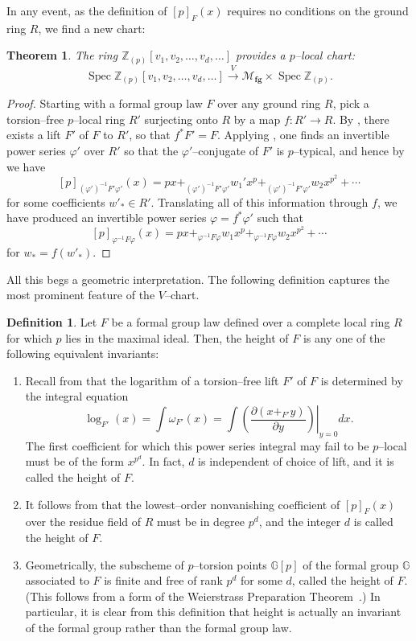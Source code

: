 \documentclass{amsart}
\newcommand{\Z}{\mathbb Z}
\newcommand{\G}{\mathbb G}
\newcommand{\<}{\langle}
\renewcommand{\>}{\rangle}
\renewcommand{\phi}{\varphi}
\newcommand{\moduli}[1]{\mathcal{M}_{\mathbf{#1}}}
\DeclareMathOperator{\Spec}{Spec}
\theoremstyle{plain}
\newtheorem*{theorem}{Theorem}
\theoremstyle{definition}
\newtheorem*{definition}{Definition}
\theoremstyle{remark}
\begin{document}
In any event, as the definition of $[p]_F(x)$ requires no conditions on the ground ring $R$, we find a new chart:
\begin{theorem}\label{VChart}
The ring $\Z_{(p)}[v_1, v_2, \ldots, v_d, \ldots]$ provides a $p$--local chart: \[\Spec \Z_{(p)}[v_1, v_2, \ldots, v_d, \ldots] \xrightarrow{V} \moduli{fg} \times \Spec \Z_{(p)}.\]
\end{theorem}
\begin{proof}
Starting with a formal group law $F$ over any ground ring $R$, pick a torsion--free $p$--local ring $R'$ surjecting onto $R$ by a map $f: R' \to R$.  By , there exists a lift $F'$ of $F$ to $R'$, so that $f^* F' = F$.  Applying , one finds an invertible power series $\phi'$ over $R'$ so that the $\phi'$--conjugate of $F'$ is $p$--typical, and hence by  we have \[[p]_{(\phi')^{-1} F' \phi'}(x) = px +_{(\phi')^{-1} F' \phi'} w_1' x^p +_{(\phi')^{-1} F' \phi'} w_2 x^{p^2} + \cdots\] for some coefficients $w'_* \in R'$.  Translating all of this information through $f$, we have produced an invertible power series $\phi = f^* \phi'$ such that \[[p]_{\phi^{-1} F \phi}(x) = px +_{\phi^{-1} F \phi} w_1 x^p +_{\phi^{-1} F \phi} w_2 x^{p^2} + \cdots\] for $w_* = f(w'_*)$.
\end{proof}

All this begs a geometric interpretation.  The following definition captures the most prominent feature of the $V$--chart.

\begin{definition}\label{DefinitionOfHeight}
Let $F$ be a formal group law defined over a complete local ring $R$ for which $p$ lies in the maximal ideal.  Then, the height of $F$ is any one of the following equivalent invariants:
\begin{enumerate}
\item Recall from  that the logarithm of a torsion--free lift $F'$ of $F$ is determined by the integral equation \[\log_{F'}(x) = \int \omega_{F'}(x) = \int \left. \left( \frac{\partial( x +_{F'} y)}{\partial y}\right) \right|_{y=0} dx.\]  The first coefficient for which this power series integral may fail to be $p$--local must be of the form $x^{p^d}$.  In fact, $d$ is independent of choice of lift, and it is called the height of $F$.
\item It follows from  that the lowest--order nonvanishing coefficient of $[p]_F(x)$ over the residue field of $R$ must be in degree $p^d$, and the integer $d$ is called the height of $F$.
\item Geometrically, the subscheme of $p$--torsion points $\G[p]$ of the formal group $\G$ associated to $F$ is finite and free of rank $p^d$ for some $d$, called the height of $F$.  (This follows from a form of the Weierstrass Preparation Theorem~\cite[Lemma 5.14]{StricklandFSFG}.)  In particular, it is clear from this definition that height is actually an invariant of the formal group rather than the formal group law.
\end{enumerate}
\end{definition}
\end{document}
